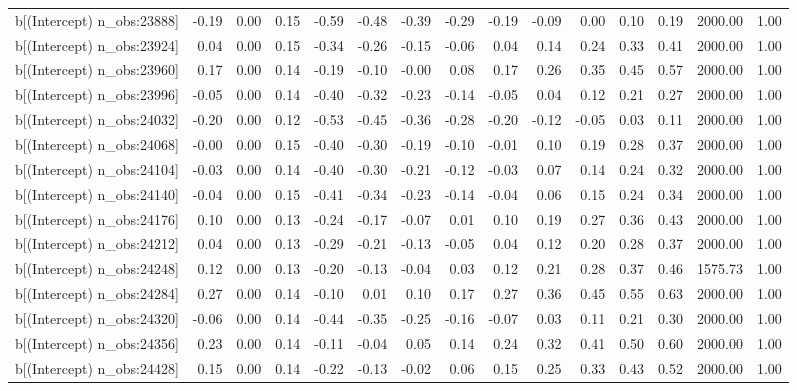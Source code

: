 \begin{table}[ht]
\begin{tabular}{rrrrrrrrrrrrrrr}
  b[(Intercept) n\_obs:23888] & -0.19 & 0.00 & 0.15 & -0.59 & -0.48 & -0.39 & -0.29 & -0.19 & -0.09 & 0.00 & 0.10 & 0.19 & 2000.00 & 1.00 \\ 
  b[(Intercept) n\_obs:23924] & 0.04 & 0.00 & 0.15 & -0.34 & -0.26 & -0.15 & -0.06 & 0.04 & 0.14 & 0.24 & 0.33 & 0.41 & 2000.00 & 1.00 \\ 
  b[(Intercept) n\_obs:23960] & 0.17 & 0.00 & 0.14 & -0.19 & -0.10 & -0.00 & 0.08 & 0.17 & 0.26 & 0.35 & 0.45 & 0.57 & 2000.00 & 1.00 \\ 
  b[(Intercept) n\_obs:23996] & -0.05 & 0.00 & 0.14 & -0.40 & -0.32 & -0.23 & -0.14 & -0.05 & 0.04 & 0.12 & 0.21 & 0.27 & 2000.00 & 1.00 \\ 
  b[(Intercept) n\_obs:24032] & -0.20 & 0.00 & 0.12 & -0.53 & -0.45 & -0.36 & -0.28 & -0.20 & -0.12 & -0.05 & 0.03 & 0.11 & 2000.00 & 1.00 \\ 
  b[(Intercept) n\_obs:24068] & -0.00 & 0.00 & 0.15 & -0.40 & -0.30 & -0.19 & -0.10 & -0.01 & 0.10 & 0.19 & 0.28 & 0.37 & 2000.00 & 1.00 \\ 
  b[(Intercept) n\_obs:24104] & -0.03 & 0.00 & 0.14 & -0.40 & -0.30 & -0.21 & -0.12 & -0.03 & 0.07 & 0.14 & 0.24 & 0.32 & 2000.00 & 1.00 \\ 
  b[(Intercept) n\_obs:24140] & -0.04 & 0.00 & 0.15 & -0.41 & -0.34 & -0.23 & -0.14 & -0.04 & 0.06 & 0.15 & 0.24 & 0.34 & 2000.00 & 1.00 \\ 
  b[(Intercept) n\_obs:24176] & 0.10 & 0.00 & 0.13 & -0.24 & -0.17 & -0.07 & 0.01 & 0.10 & 0.19 & 0.27 & 0.36 & 0.43 & 2000.00 & 1.00 \\ 
  b[(Intercept) n\_obs:24212] & 0.04 & 0.00 & 0.13 & -0.29 & -0.21 & -0.13 & -0.05 & 0.04 & 0.12 & 0.20 & 0.28 & 0.37 & 2000.00 & 1.00 \\ 
  b[(Intercept) n\_obs:24248] & 0.12 & 0.00 & 0.13 & -0.20 & -0.13 & -0.04 & 0.03 & 0.12 & 0.21 & 0.28 & 0.37 & 0.46 & 1575.73 & 1.00 \\ 
  b[(Intercept) n\_obs:24284] & 0.27 & 0.00 & 0.14 & -0.10 & 0.01 & 0.10 & 0.17 & 0.27 & 0.36 & 0.45 & 0.55 & 0.63 & 2000.00 & 1.00 \\ 
  b[(Intercept) n\_obs:24320] & -0.06 & 0.00 & 0.14 & -0.44 & -0.35 & -0.25 & -0.16 & -0.07 & 0.03 & 0.11 & 0.21 & 0.30 & 2000.00 & 1.00 \\ 
  b[(Intercept) n\_obs:24356] & 0.23 & 0.00 & 0.14 & -0.11 & -0.04 & 0.05 & 0.14 & 0.24 & 0.32 & 0.41 & 0.50 & 0.60 & 2000.00 & 1.00 \\ 
  b[(Intercept) n\_obs:24428] & 0.15 & 0.00 & 0.14 & -0.22 & -0.13 & -0.02 & 0.06 & 0.15 & 0.25 & 0.33 & 0.43 & 0.52 & 2000.00 & 1.00 \\ 

\end{tabular}
\end{table}
